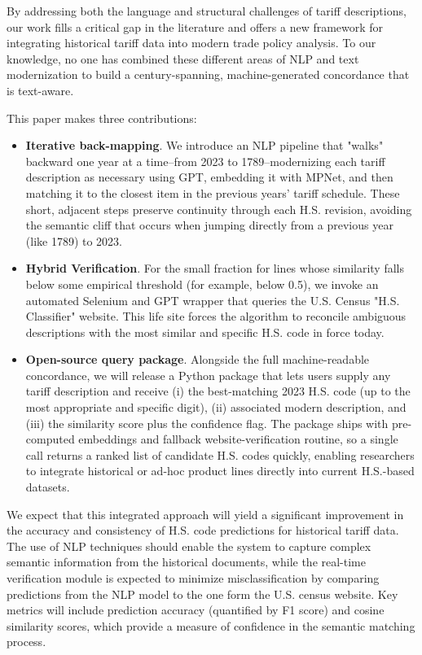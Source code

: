 \documentclass[12pt]{article}
\begin{document}
By addressing both the language and structural challenges of tariff descriptions, our work fills a critical gap in the literature and offers a new framework for integrating historical tariff data into modern trade policy analysis. To our knowledge, no one has combined these different areas of NLP and text modernization to build a century-spanning, machine-generated concordance that is text-aware. 
\newline

This paper makes three contributions:

\begin{itemize}
    \item \textbf{Iterative back-mapping}. We introduce an NLP pipeline that "walks" backward one year at a time--from 2023 to 1789--modernizing each tariff description as necessary using GPT, embedding it with MPNet, and then matching it to the closest item in the previous years' tariff schedule. These short, adjacent steps preserve continuity through each H.S. revision, avoiding the semantic cliff that occurs when jumping directly from a previous year (like 1789) to 2023.
    \item \textbf{Hybrid Verification}. For the small fraction for lines whose similarity falls below some empirical threshold (for example, below 0.5), we invoke an automated Selenium and GPT wrapper that queries the U.S. Census "H.S. Classifier" website. This life site forces the algorithm to reconcile ambiguous descriptions with the most similar and specific H.S. code in force today. 

    \item \textbf{Open-source query package}. Alongside the full machine-readable concordance, we will release a Python package that lets users supply any tariff description and receive (i) the best-matching 2023 H.S. code (up to the most appropriate and specific digit), (ii) associated modern description, and (iii) the similarity score plus the confidence flag. The package ships with pre-computed embeddings and fallback website-verification routine, so a single call returns a ranked list of candidate H.S. codes quickly, enabling researchers to integrate historical or ad-hoc product lines directly into current H.S.-based datasets. 
\end{itemize}



We expect that this integrated approach will yield a significant improvement in the accuracy and consistency of H.S. code predictions for historical tariff data. The use of NLP techniques should enable the system to capture complex semantic information from the historical documents, while the real-time verification module is expected to minimize misclassification by comparing predictions from the NLP model to the one form the U.S. census website. Key metrics will include prediction accuracy (quantified by F1 score) and cosine similarity scores, which provide a measure of confidence in the semantic matching process. 
\end{document}
